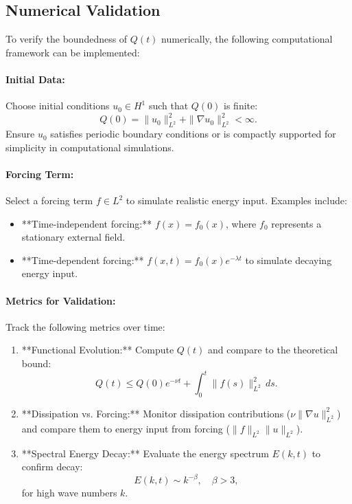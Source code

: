 \subsection{Numerical Validation}
To verify the boundedness of $Q(t)$ numerically, the following computational framework can be implemented:

\paragraph{Initial Data:} Choose initial conditions $u_0 \in H^1$ such that $Q(0)$ is finite:
\begin{equation}
Q(0) = \|u_0\|_{L^2}^2 + \|\nabla u_0\|_{L^2}^2 < \infty.
\end{equation}
Ensure $u_0$ satisfies periodic boundary conditions or is compactly supported for simplicity in computational simulations.

\paragraph{Forcing Term:} Select a forcing term $f \in L^2$ to simulate realistic energy input. Examples include:
\begin{itemize}
    \item **Time-independent forcing:** $f(x) = f_0(x)$, where $f_0$ represents a stationary external field.
    \item **Time-dependent forcing:** $f(x, t) = f_0(x) e^{-\lambda t}$ to simulate decaying energy input.
\end{itemize}

\paragraph{Metrics for Validation:}
Track the following metrics over time:
\begin{enumerate}
    \item **Functional Evolution:** Compute $Q(t)$ and compare to the theoretical bound:
    \begin{equation}
    Q(t) \leq Q(0) e^{-\nu t} + \int_0^t \|f(s)\|_{L^2}^2 \, ds.
    \end{equation}
    \item **Dissipation vs. Forcing:** Monitor dissipation contributions ($\nu \|\nabla u\|_{L^2}^2$) and compare them to energy input from forcing ($\|f\|_{L^2} \|u\|_{L^2}$).
    \item **Spectral Energy Decay:** Evaluate the energy spectrum $E(k, t)$ to confirm decay:
    \begin{equation}
    E(k, t) \sim k^{-\beta}, \quad \beta > 3,
    \end{equation}
    for high wave numbers $k$.
\end{enumerate}

